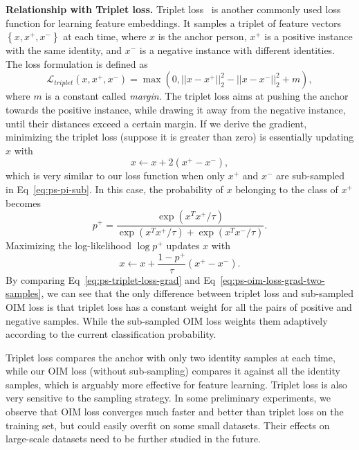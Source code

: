 \textbf{Relationship with Triplet loss.} Triplet loss~\cite{schroff2015facenet} is another commonly used loss function for learning feature embeddings. It samples a triplet of feature vectors $\left\{x,x^+,x^-\right\}$ at each time, where $x$ is the anchor person, $x^+$ is a positive instance with the same identity, and $x^-$ is a negative instance with different identities. The loss formulation is defined as
\begin{equation} \label{eq:ps-triplet-loss}
\mathcal{L}_{triplet}\left(x,x^+,x^-\right)=\max\left(0, ||x-x^+||_2^2 - ||x-x^-||_2^2 + m\right),
\end{equation}
where $m$ is a constant called \emph{margin}. The triplet loss aims at pushing the anchor towards the positive instance, while drawing it away from the negative instance, until their distances exceed a certain margin. If we derive the gradient, minimizing the triplet loss (suppose it is greater than zero) is essentially updating $x$ with
\begin{equation} \label{eq:ps-triplet-loss-grad}
x\gets x + 2(x^+-x^-),
\end{equation}
which is very similar to our loss function when only $x^+$ and $x^-$ are sub-sampled in Eq~\eqref{eq:ps-pi-sub}. In this case, the probability of $x$ belonging to the class of $x^+$ becomes
\begin{equation} \label{eq:ps-p-pos}
p^+=\frac{\exp(x^Tx^+/\tau)}{\exp(x^Tx^+/\tau)+\exp(x^Tx^-/\tau)}.
\end{equation}
Maximizing the log-likelihood $\log p^+$ updates $x$ with
\begin{equation} \label{eq:ps-oim-loss-grad-two-samples}
x\gets x + \frac{1-p^+}{\tau}(x^+-x^-).
\end{equation}
By comparing Eq~\eqref{eq:ps-triplet-loss-grad} and Eq~\eqref{eq:ps-oim-loss-grad-two-samples}, we can see that the only difference between triplet loss and sub-sampled OIM loss is that triplet loss has a constant weight for all the pairs of positive and negative samples. While the sub-sampled OIM loss weights them adaptively according to the current classification probability.

Triplet loss compares the anchor with only two identity samples at each time, while our OIM loss (without sub-sampling) compares it against all the identity samples, which is arguably more effective for feature learning. Triplet loss is also very sensitive to the sampling strategy. In some preliminary experiments, we observe that OIM loss converges much faster and better than triplet loss on the training set, but could easily overfit on some small datasets. Their effects on large-scale datasets need to be further studied in the future.


